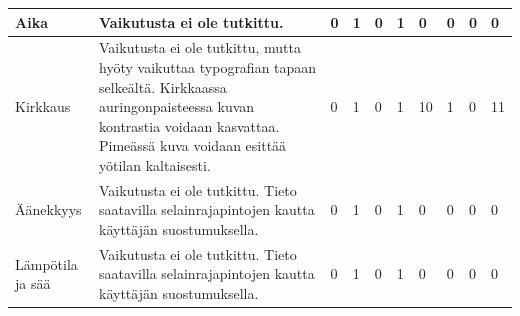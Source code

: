 \documentclass[finnish, 12pt, a4paper, elec, utf8, a-1b, online]{aaltothesis}
\begin{document}
{\begin{longtable}{p{2.5cm}|p{6cm}|p{0.5cm}p{0.5cm}p{0.5cm}|p{0.5cm}|p{0.5cm}p{0.5cm}p{0.5cm}|p{0.5cm}|}
        \midrule
        Aika                                   & Vaikutusta ei ole tutkittu.                                                                                                                                                                                                                                                                                                                                               & 0                                          & 1                                   & 0                                      & 1                            & 0                                               & 0                                         & 0                                         & 0                            \\
        \midrule
        Kirkkaus                               & Vaikutusta ei ole tutkittu, mutta hyöty vaikuttaa typografian tapaan selkeältä. Kirkkaassa auringonpaisteessa kuvan kontrastia voidaan kasvattaa. Pimeässä kuva voidaan esittää yötilan kaltaisesti.                                                                                                                                                                      & 0                                          & 1                                   & 0                                      & 1                            & 10                                              & 1                                         & 0                                         & 11                           \\
        \midrule
        Äänekkyys                              & Vaikutusta ei ole tutkittu. Tieto saatavilla selainrajapintojen kautta käyttäjän suostumuksella.                                                                                                                                                                                                                                                                          & 0                                          & 1                                   & 0                                      & 1                            & 0                                               & 0                                         & 0                                         & 0                            \\
        \midrule
        Lämpötila ja sää                       & Vaikutusta ei ole tutkittu. Tieto saatavilla selainrajapintojen kautta käyttäjän suostumuksella.                                                                                                                                                                                                                                                                          & 0                                          & 1                                   & 0                                      & 1                            & 0                                               & 0                                         & 0                                         & 0                            \\

\end{longtable}}
\end{document}
